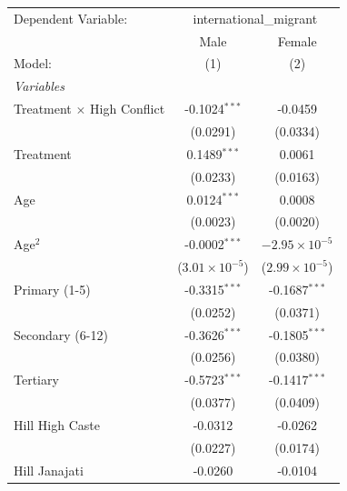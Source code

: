 
\begingroup
\centering
\begin{tabular}{lcc}
   \tabularnewline \midrule \midrule
   Dependent Variable: & \multicolumn{2}{c}{international\_migrant}\\
                                     & Male                    & Female \\   
   Model:                            & (1)                     & (2)\\  
   \midrule
   \emph{Variables}\\
   Treatment $\times$ High Conflict  & -0.1024$^{***}$         & -0.0459\\   
                                     & (0.0291)                & (0.0334)\\   
   Treatment                         & 0.1489$^{***}$          & 0.0061\\   
                                     & (0.0233)                & (0.0163)\\   
   Age                               & 0.0124$^{***}$          & 0.0008\\   
                                     & (0.0023)                & (0.0020)\\   
   Age$^2$                           & -0.0002$^{***}$         & $-2.95\times 10^{-5}$\\    
                                     & ($3.01\times 10^{-5}$)  & ($2.99\times 10^{-5}$)\\    
   Primary (1-5)                     & -0.3315$^{***}$         & -0.1687$^{***}$\\   
                                     & (0.0252)                & (0.0371)\\   
   Secondary (6-12)                  & -0.3626$^{***}$         & -0.1805$^{***}$\\   
                                     & (0.0256)                & (0.0380)\\   
   Tertiary                          & -0.5723$^{***}$         & -0.1417$^{***}$\\   
                                     & (0.0377)                & (0.0409)\\   
   Hill High Caste                   & -0.0312                 & -0.0262\\   
                                     & (0.0227)                & (0.0174)\\   
   Hill Janajati                     & -0.0260                 & -0.0104\\   

\end{tabular}
